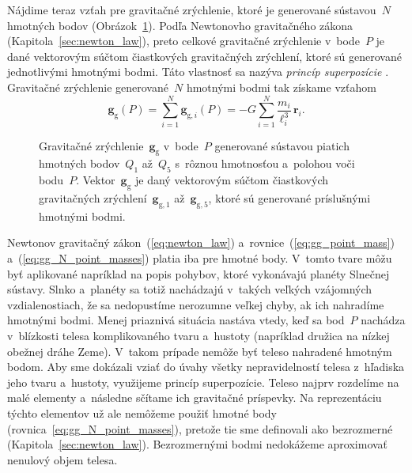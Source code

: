 \documentclass[a4paper, 12pt]{book}
\newcommand{\gidx}{\mathrm g}
\let\vec\mathbf
\begin{document}
Nájdime teraz vzťah pre gravitačné zrýchlenie, ktoré je generované sústavou~$N$ 
hmotných bodov (Obrázok~\ref{fig:gg_n_point_masses}).  Podľa Newtonovho 
gravitačného zákona  (Kapitola~\ref{sec:newton_law}), preto celkové 
gravitačné zrýchlenie v~bode~$P$ je dané vektorovým súčtom čiastkových 
gravitačných zrýchlení, ktoré sú generované jednotlivými hmotnými bodmi.  Táto 
vlastnosť sa nazýva \emph{princíp superpozície} \parencite{Hotine}.  Gravitačné 
zrýchlenie generované~$N$ hmotnými bodmi tak získame vzťahom
%
\begin{equation}
\label{eq:gg_N_point_masses}
\vec g_\gidx(P) = \sum_{i = 1}^{N}\vec g_{\gidx,i}(P) = -G \sum_{i = 1}^{N}
\frac{m_i}{\ell_i^3} \, \vec{r}_i{.}
\end{equation}

\begin{figure}
\centering

\caption{Gravitačné zrýchlenie~$\vec g_\gidx$ v~bode~$P$ generované sústavou 
piatich hmotných bodov~$Q_1$ až~$Q_5$ s~rôznou hmotnosťou a~polohou voči 
bodu~$P$.  Vektor~$\vec g_\gidx$ je daný vektorovým súčtom čiastkových 
gravitačných zrýchlení~$\vec g_{\gidx,1}$ až~$\vec g_{\gidx,5}$, ktoré sú 
generované príslušnými hmotnými bodmi.}
\label{fig:gg_n_point_masses}
\end{figure}

Newtonov gravitačný zákon~(\ref{eq:newton_law}) 
a~rovnice~(\ref{eq:gg_point_mass}) a~(\ref{eq:gg_N_point_masses}) platia iba 
pre hmotné body.  V~tomto tvare môžu byť aplikované napríklad na popis pohybov, 
ktoré vykonávajú planéty Slnečnej sústavy.  Slnko a~planéty sa totiž nachádzajú 
v~takých veľkých vzájomných vzdialenostiach, že sa nedopustíme nerozumne veľkej 
chyby, ak ich nahradíme hmotnými bodmi.  Menej priaznivá situácia nastáva 
vtedy, keď sa bod~$P$ nachádza v~blízkosti telesa komplikovaného tvaru 
a~hustoty (napríklad družica na nízkej obežnej dráhe Zeme).  V~takom prípade 
nemôže byť teleso nahradené hmotným bodom.  Aby sme dokázali vziať do úvahy 
všetky nepravidelností telesa z~hľadiska jeho tvaru a~hustoty, využijeme 
princíp superpozície.  Teleso najprv rozdelíme na malé elementy a~následne 
sčítame ich gravitačné príspevky.  Na reprezentáciu týchto elementov už ale 
nemôžeme použiť hmotné body (rovnica~\ref{eq:gg_N_point_masses}), pretože tie 
sme definovali ako bezrozmerné (Kapitola~\ref{sec:newton_law}).  Bezrozmernými 
bodmi nedokážeme aproximovať nenulový objem telesa.
\end{document}
